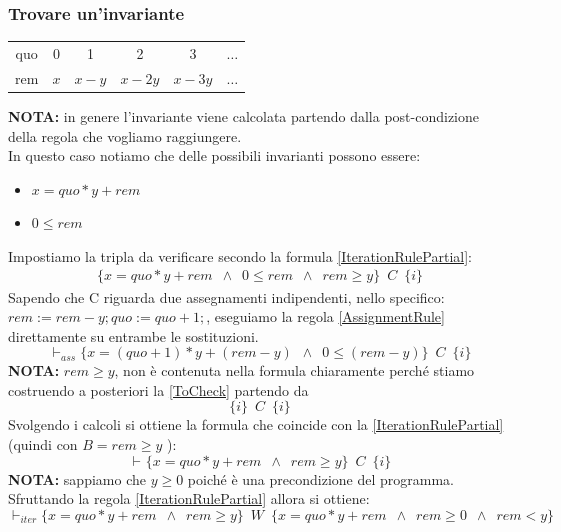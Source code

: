 \begin{esempio}
				      					\subsubsection{Trovare un'invariante}
				      					\begin{table}[H]
				      						\centering
				      						\begin{tabular}[H]{c|ccccc}
				      							quo & 0   & 1     & 2      & 3      & $\ldots$ \\
				      							rem & $x$ & $x-y$ & $x-2y$ & $x-3y$ & $\ldots$ 
				      						\end{tabular}
				      					\end{table}
				      					\textbf{NOTA:} in genere l'invariante viene calcolata partendo dalla post-condizione della regola che vogliamo raggiungere.\\
				      					In questo caso notiamo che delle possibili invarianti possono essere:
				      					\begin{itemize}
				      						\item $x=quo*y + rem$
				      						\item $0 \leq rem$
				      					\end{itemize}
				      					Impostiamo la tripla da verificare secondo la formula \ref{IterationRulePartial}:\\
				      					\begin{align}
				      						\{x=quo*y + rem\,\,\,\land\,\,\, 0 \leq rem\,\,\,\land\,\,\, rem\geq y\}\,\,\, C\,\,\,\{i\} 
				      						\label{ToCheck}                                                                          
				      					\end{align}
				      					Sapendo che C riguarda due assegnamenti indipendenti, nello specifico: $        rem := rem - y; quo := quo + 1;$, eseguiamo la regola \ref{AssignmentRule} direttamente su entrambe le sostituzioni.
				      					\[\vdash_{ass}\{x=(quo+1)*y + (rem -y)\,\,\,\land\,\,\, 0 \leq (rem-y)\}\,\,\, C\,\,\,\{i\}\]
				      					\textbf{NOTA:} $rem \geq y $, non è contenuta nella formula chiaramente perché stiamo costruendo a posteriori la \ref{ToCheck} partendo da \[\{i\}\,\,\, C\,\,\,\{i\}\]
				      					Svolgendo i calcoli si ottiene la formula che coincide con la \ref{IterationRulePartial} (quindi con $B = rem\geq y$ ):
				      					\[\vdash_{}\{x=quo*y + rem\,\,\,\land\,\,\, rem\geq y\}\,\,\, C\,\,\,\{i\}\]
				      					\textbf{NOTA:} sappiamo che $y\geq0$ poiché è una precondizione del programma.
				      					Sfruttando la regola \ref{IterationRulePartial} allora si ottiene:
				      					\[\vdash_{iter}\{x=quo*y + rem\,\,\,\land\,\,\, rem\geq y\}\,\,\, W\,\,\,\{x=quo*y + rem\,\,\,\land\,\,\, rem\geq 0\,\,\,\land\,\,\, rem<y\}\]

\end{esempio}
